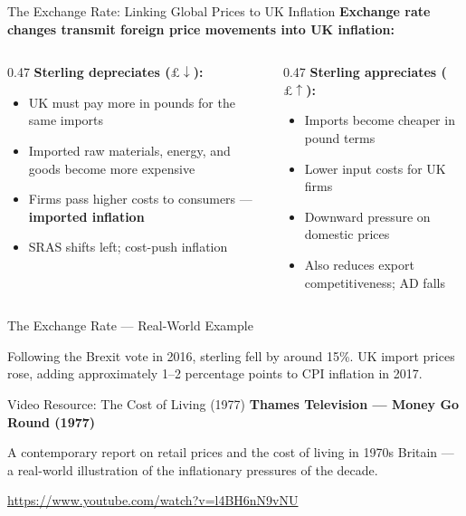 \documentclass[16pt,aspectratio=169]{beamer}
\begin{document}
\begin{frame}{The Exchange Rate: Linking Global Prices to UK Inflation}
    \textbf{Exchange rate changes transmit foreign price movements into UK inflation:}

    \vspace{0.4em}
    \begin{columns}
        \begin{column}{0.47\textwidth}
            \textbf{Sterling depreciates ($\pounds \downarrow$):}
            \begin{itemize}
                \item UK must pay more in pounds for the same imports
                \item Imported raw materials, energy, and goods become more expensive
                \item Firms pass higher costs to consumers --- \textbf{imported inflation}
                \item SRAS shifts left; cost-push inflation
            \end{itemize}
        \end{column}
        \begin{column}{0.47\textwidth}
            \textbf{Sterling appreciates ($\pounds \uparrow$):}
            \begin{itemize}
                \item Imports become cheaper in pound terms
                \item Lower input costs for UK firms
                \item Downward pressure on domestic prices
                \item Also reduces export competitiveness; AD falls
            \end{itemize}
        \end{column}
    \end{columns}
\end{frame}

\begin{frame}{The Exchange Rate --- Real-World Example}
    \begin{example}
        Following the Brexit vote in 2016, sterling fell by around 15\%. UK import prices rose, adding approximately 1--2 percentage points to CPI inflation in 2017.
    \end{example}
\end{frame}

\begin{frame}{Video Resource: The Cost of Living (1977)}
    \textbf{Thames Television --- Money Go Round (1977)}

    \vspace{0.6em}
    A contemporary report on retail prices and the cost of living in 1970s Britain --- a real-world illustration of the inflationary pressures of the decade.

    \vspace{0.8em}
    \url{https://www.youtube.com/watch?v=l4BH6nN9vNU}
\end{frame}
\end{document}

